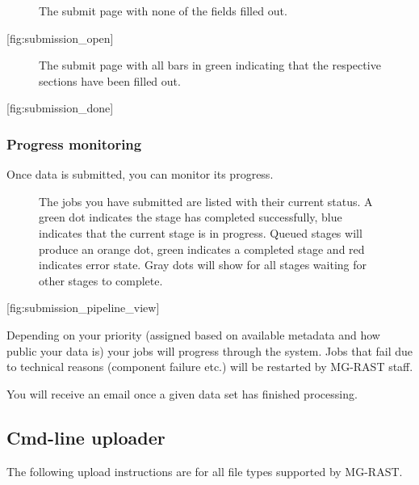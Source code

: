 \documentclass[letterpaper,10pt,english]{sphinxmanual}
\begin{document}
\begin{figure}[htbp]
\centering
\capstart

\noindent{}
\caption{The submit page with none of the fields filled out.}\label{\detokenize{faq:id7}}\end{figure}

{[}fig:submission\_open{]}

\begin{figure}[htbp]
\centering
\capstart

\noindent{}
\caption{The submit page with all bars in green indicating that the respective
sections have been filled out.}\label{\detokenize{faq:id8}}\end{figure}

{[}fig:submission\_done{]}


\subsubsection{Progress monitoring}
\label{\detokenize{faq:progress-monitoring}}
Once data is submitted, you can monitor its progress.

\begin{figure}[htbp]
\centering
\capstart

\noindent{}
\caption{The jobs you have submitted are listed with their current status. A
green dot indicates the stage has completed successfully, blue
indicates that the current stage is in progress. Queued stages will
produce an orange dot, green indicates a completed stage and red
indicates error state. Gray dots will show for all stages waiting for
other stages to complete.}\label{\detokenize{faq:id9}}\end{figure}

{[}fig:submission\_pipeline\_view{]}

Depending on your priority (assigned based on available metadata and how
public your data is) your jobs will progress through the system. Jobs
that fail due to technical reasons (component failure etc.) will be
restarted by MG-RAST staff.

You will receive an email once a given data set has finished processing.


\subsection{Cmd-line uploader}
\label{\detokenize{faq:cmd-line-uploader}}
The following upload instructions are for all file types supported by
MG-RAST.
\end{document}
